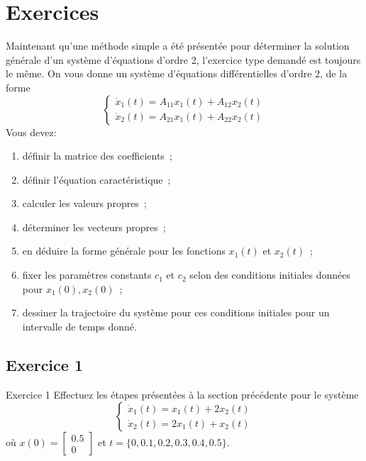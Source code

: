     \section{Exercices}
        Maintenant qu'une méthode simple a été présentée pour déterminer la solution générale d'un système  d'équations d'ordre 2, l'exercice type demandé est toujours le même. On vous donne un système d'équations différentielles d'ordre 2, de la forme
        \begin{equation}
            \begin{cases}
                \dot{x}_1(t)=A_{11} x_1(t) + A_{12} x_2(t)\\
                \dot{x}_2(t)=A_{21} x_1(t) + A_{22} x_2(t)
            \end{cases}
        \end{equation}
        Vous devez:
        \begin{enumerate}
            \item définir la matrice des coefficients~;
            \item définir l'équation caractéristique~;
            \item calculer les valeurs propres~;
            \item déterminer les vecteurs propres~;
            \item en déduire la forme générale pour les fonctions $x_1(t)$ et $x_2(t)$~;
            \item fixer les paramètres constants $c_1$ et $c_2$ selon des conditions initiales données pour $x_1(0), x_2(0)$~;
            \item dessiner la trajectoire du système pour ces conditions initiales pour un intervalle de temps donné.
        \end{enumerate}
        \subsection{Exercice 1}
            \begin{exercise}{Exercice 1}
                Effectuez les étapes présentées à la section précédente pour le système
                \begin{equation}
                    \begin{cases}
                        \dot{x}_1(t)=x_1(t) + 2 x_2(t)\\
                        \dot{x}_2(t)=2 x_1(t) + x_2(t)
                    \end{cases}
                \end{equation}
                où $x(0)=\begin{bmatrix} 0.5 \\ 0 \end{bmatrix}$ et $t=\{0, 0.1, 0.2, 0.3, 0.4, 0.5\}$.
            \end{exercise}

